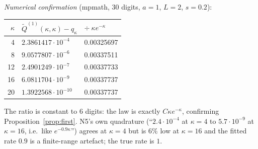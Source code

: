 \documentclass[11pt]{article}
\begin{document}
\emph{Numerical confirmation} (mpmath, $30$ digits, $a=1$, $L=2$, $s=0.2$):
\begin{center}\small
\begin{tabular}{r l l}\toprule
$\kappa$ & $\widetilde Q^{(1)}(\kappa,\kappa)-q_\kappa$ & $\div\ \kappa e^{-\kappa}$\\\midrule
4 & $2.3861417\cdot10^{-4}$ & 0.00325697\\
8 & $9.0577807\cdot10^{-6}$ & 0.00337511\\
12 & $2.4901249\cdot10^{-7}$ & 0.00337733\\
16 & $6.0811704\cdot10^{-9}$ & 0.00337737\\
20 & $1.3922568\cdot10^{-10}$ & 0.00337737\\\bottomrule
\end{tabular}\end{center}
The ratio is constant to $6$ digits: the law is exactly $C\kappa e^{-\kappa}$, confirming
Proposition~\ref{prop:first}.  N5's own quadrature (``$2.4\cdot10^{-4}$ at $\kappa=4$ to
$5.7\cdot10^{-9}$ at $\kappa=16$, i.e.\ like $e^{-0.9\kappa}$'') agrees at $\kappa=4$ but is
$6\%$ low at $\kappa=16$ and the fitted rate $0.9$ is a finite-range artefact; the true rate is $1$.
\end{document}
